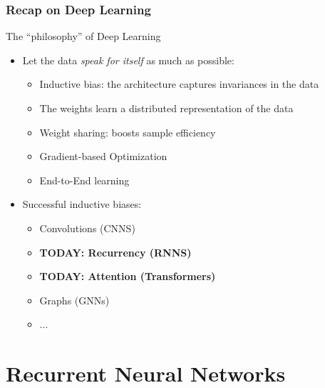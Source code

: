 \documentclass[10pt]{beamer}
\begin{document}
\begin{frame}
  \frametitle{Recap on Deep Learning}
	The ``philosophy'' of Deep Learning
	\vspace{.25cm}
	\begin{itemize}
	\item Let the data \emph{speak for itself} as much as possible:
	\begin{itemize}
	\vspace{.1cm}	\item {\color{blue} Inductive bias}: the architecture captures invariances in the data
	\vspace{.1cm}	\item The weights learn a {\color{blue} distributed representation} of the data
	\vspace{.1cm}	\item {\color{blue} Weight sharing}: boosts sample efficiency
	\vspace{.1cm}	\item {\color{blue} Gradient-based} Optimization
	\vspace{.1cm}	\item {\color{blue} End-to-End} learning
	\end{itemize}
	\vspace{.25cm}
	\item Successful inductive biases:
	\begin{itemize}
	\vspace{.1cm}	\item Convolutions (CNNS)
	\vspace{.1cm}	\item \textbf{TODAY: Recurrency (RNNS)}
	\vspace{.1cm}	\item \textbf{TODAY: Attention (Transformers)}
	\vspace{.1cm}	\item Graphs (GNNs)
	\item ...
	\end{itemize}
	\end{itemize}
\end{frame}


\section{Recurrent Neural Networks}
\end{document}
